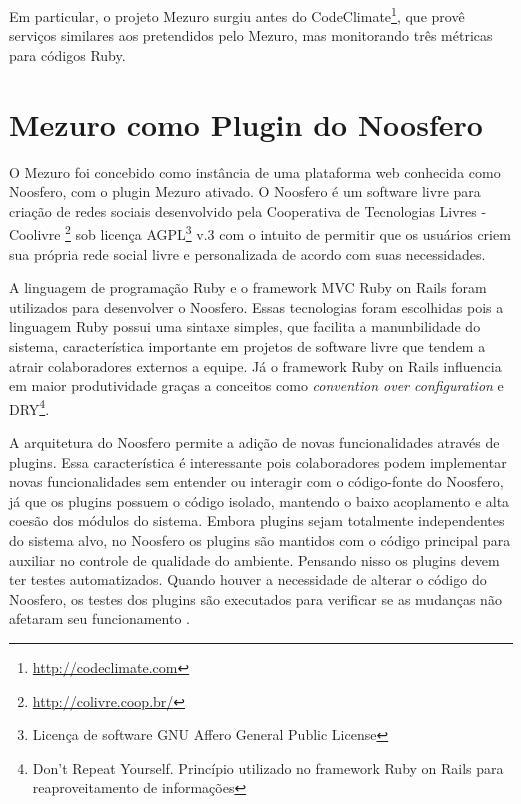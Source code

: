 Em particular, o projeto Mezuro surgiu antes do CodeClimate\footnote{\url{http://codeclimate.com}}, que provê serviços similares aos pretendidos pelo Mezuro, mas monitorando três métricas para códigos Ruby.



\section{Mezuro como Plugin do Noosfero}

O Mezuro foi concebido como instância de uma plataforma web conhecida como Noosfero, com o plugin Mezuro ativado. O Noosfero é um software livre para criação de redes sociais desenvolvido pela Cooperativa de Tecnologias Livres - Coolivre \footnote{\url{http://colivre.coop.br/}} sob licença AGPL\footnote{Licença de software GNU Affero General Public License} v.3 com o intuito de permitir que os usuários criem sua própria rede social livre e personalizada de acordo com suas necessidades.

A linguagem de programação Ruby e o framework MVC Ruby on Rails foram utilizados para desenvolver o Noosfero. Essas tecnologias foram escolhidas pois a linguagem Ruby possui uma sintaxe simples, que facilita a manunbilidade do sistema, característica importante em projetos de software livre que tendem a atrair colaboradores externos a equipe. Já o framework Ruby on Rails influencia em maior produtividade graças a conceitos como \textit{convention over configuration} e DRY\footnote{Don't Repeat Yourself. Princípio utilizado no framework Ruby on Rails para reaproveitamento de informações}.

A arquitetura do Noosfero permite a adição de novas funcionalidades através de plugins. Essa característica é interessante pois colaboradores podem implementar novas funcionalidades sem entender ou interagir com o código-fonte do Noosfero, já que os plugins possuem o código isolado, mantendo o baixo acoplamento e alta coesão dos módulos do sistema. Embora plugins sejam totalmente independentes do sistema alvo, no Noosfero os plugins são mantidos com o código principal para auxiliar no controle de qualidade do ambiente. Pensando nisso os plugins devem ter testes automatizados. Quando houver a necessidade de alterar o código do Noosfero, os testes dos plugins são executados para verificar se as mudanças não afetaram seu funcionamento \cite{noosfero2013plugins}.

